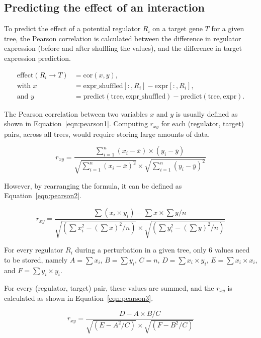 \subsection{Predicting the effect of an interaction}
To predict the effect of a potential regulator $R_i$ on a target gene $T$ for a given tree, the Pearson correlation is calculated between the difference in regulator expression (before and after shuffling the values), and the difference in target expression prediction. 

\begin{align*}
  \text{effect}(R_i \rightarrow T) & = \text{cor}(x, y), \\
  \text{with } x & = \text{expr\_shuffled}[:,R_i] - \text{expr}[:,R_i], \\
  \text{and } y & = \text{predict}(\text{tree}, \text{expr\_shuffled}) - \text{predict}(\text{tree}, \text{expr}).
\end{align*}

The Pearson correlation between two variables $x$ and $y$ is usually defined as shown in Equation~\ref{eqn:pearson1}. Computing $r_{xy}$ for each (regulator, target) pairs, across all trees, would require storing large amounts of data.

\begin{equation}\label{eqn:pearson1}
	r_{xy} = \frac{\sum^n_{i=1} (x_i - \bar{x}) \times (y_i - \bar{y})}{\sqrt{\sum^n_{i=1}(x_i - \bar{x})^2}\times\sqrt{\sum^n_{i=1}(y_i - \bar{y})^2}}
\end{equation} 

However, by rearranging the formula, it can be defined as Equation~\ref{eqn:pearson2}.

\begin{equation}\label{eqn:pearson2}
r_{xy} = \frac{\sum(x_i \times y_i) - \sum x \times \sum y / n}{\sqrt{(\sum x_i^2 - (\sum x)^2 / n)} \times \sqrt{(\sum y_i^2 - (\sum y)^2 / n)}}
\end{equation}

For every regulator $R_i$ during a perturbation in a given tree, only 6 values need to be stored, namely $A = \sum x_i$, $B = \sum y_i$, $C = n$, $D = \sum{x_i \times y_i}$, $E = \sum{x_i \times x_i}$, and $F = \sum{y_i \times y_i}$.

For every (regulator, target) pair, these values are summed, and the $r_{xy}$ is calculated as shown in Equation~\ref{eqn:pearson3}.

\begin{equation}\label{eqn:pearson3}
r_{xy} = \frac{D - A \times B / C}{\sqrt{(E - A^2 / C)} \times \sqrt{(F - B^2 / C)}}
\end{equation}

